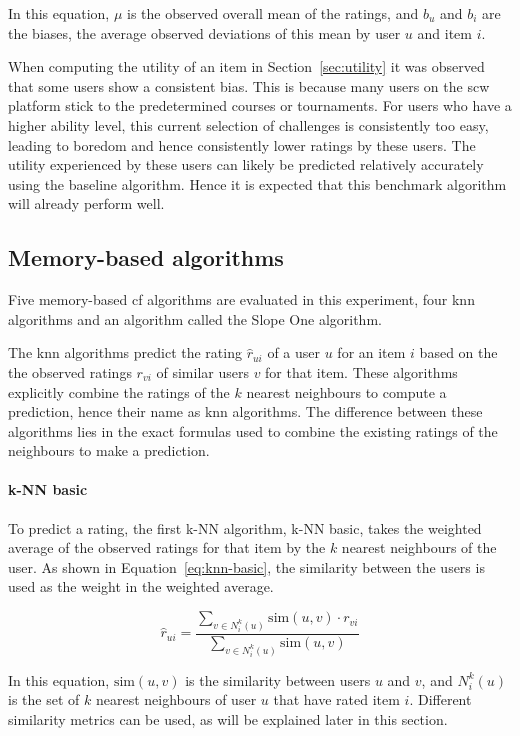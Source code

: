 In this equation, $\mu$ is the observed overall mean of the ratings, and $b_u$ and $b_i$ are the biases, the average observed deviations of this mean by user $u$ and item $i$.

When computing the utility of an item in Section~\ref{sec:utility} it was observed that some users show a consistent bias.
This is because many users on the \gls{scw} platform stick to the predetermined courses or tournaments.
For users who have a higher ability level, this current selection of challenges is consistently too easy, leading to boredom and hence consistently lower ratings by these users.
The utility experienced by these users can likely be predicted relatively accurately using the baseline algorithm.
Hence it is expected that this benchmark algorithm will already perform well.

\subsection{Memory-based algorithms}
Five memory-based \gls{cf} algorithms are evaluated in this experiment, four \gls{knn} algorithms and an algorithm called the Slope One algorithm.

The \gls{knn} algorithms predict the rating $\hat{r}_{ui}$ of a user $u$ for an item $i$ based on the the observed ratings $r_{vi}$ of similar users $v$ for that item.
These algorithms explicitly combine the ratings of the $k$ nearest neighbours to compute a prediction, hence their name as \gls{knn} algorithms.
The difference between these algorithms lies in the exact formulas used to combine the existing ratings of the neighbours to make a prediction.

\paragraph{k-NN basic}
To predict a rating, the first k-NN algorithm, k-NN basic, takes the weighted average of the observed ratings for that item by the $k$ nearest neighbours of the user.
As shown in Equation~\ref{eq:knn-basic}, the similarity between the users is used as the weight in the weighted average.

\begin{equation}
    \label{eq:knn-basic}
    \hat{r}_{ui} = \frac{\sum\limits_{v \in N_i^k(u)} \text{sim}(u, v) \cdot r_{vi} }{\sum\limits_{v \in N_i^k(u)} \text{sim}(u, v)}
\end{equation}

In this equation, $\text{sim}(u,v)$ is the similarity between users $u$ and $v$, and $N_i^k(u)$ is the set of $k$ nearest neighbours of user $u$ that have rated item $i$.
Different similarity metrics can be used, as will be explained later in this section.

